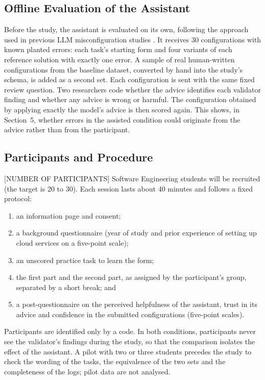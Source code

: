\subsection{Offline Evaluation of the Assistant}

Before the study, the assistant is evaluated on its own, following the approach used in previous LLM misconfiguration studies \cite{wen2026,sajadi2025}. It receives 30 configurations with known planted errors: each task's starting form and four variants of each reference solution with exactly one error. A sample of real human-written configurations from the baseline dataset, converted by hand into the study's schema, is added as a second set. Each configuration is sent with the same fixed review question. Two researchers code whether the advice identifies each validator finding and whether any advice is wrong or harmful. The configuration obtained by applying exactly the model's advice is then scored again. This shows, in Section~5, whether errors in the assisted condition could originate from the advice rather than from the participant.

\subsection{Participants and Procedure}

[NUMBER OF PARTICIPANTS] Software Engineering students will be recruited (the target is 20 to 30). Each session lasts about 40 minutes and follows a fixed protocol:
\begin{enumerate}
    \item an information page and consent;
    \item a background questionnaire (year of study and prior experience of setting up cloud services on a five-point scale);
    \item an unscored practice task to learn the form;
    \item the first part and the second part, as assigned by the participant's group, separated by a short break; and
    \item a post-questionnaire on the perceived helpfulness of the assistant, trust in its advice and confidence in the submitted configurations (five-point scales).
\end{enumerate}
Participants are identified only by a code. In both conditions, participants never see the validator's findings during the study, so that the comparison isolates the effect of the assistant. A pilot with two or three students precedes the study to check the wording of the tasks, the equivalence of the two sets and the completeness of the logs; pilot data are not analysed.

